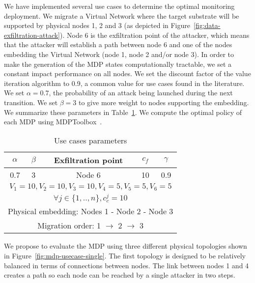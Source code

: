 We have implemented several use cases to determine the optimal monitoring deployment.
We migrate a Virtual Network where the target substrate will be supported by physical nodes 1, 2 and 3 (as depicted in Figure~\ref{fig:data-exfiltration-attack}).
Node 6 is the exfiltration point of the attacker, which means that the attacker will establish a path between node 6 and one of the nodes embedding the Virtual Network (\ie node 1, node 2 and/or node 3).
In order to make the generation of the MDP states computationally tractable, we set a constant impact performance on all nodes. We set the discount factor of the value iteration algorithm to 0.9, a common value for use cases found in the literature.
We set $\alpha=0.7$, the probability of an attack being launched during the next transition.
We set $\beta=3$ to give more weight to nodes supporting the embedding.
We summarize these parameters in Table~\ref{tab:mdp-parameters}.
We compute the optimal policy of each MDP using MDPToolbox~\cite{Chades2014}.

\begin{table}[h]
\centering
\begin{tabular}{|c|c|l|c|c|c|}
\hline
$\alpha$ & \multicolumn{2}{c|}{$\beta$} & Exfiltration point & $c_f$ & $\gamma$ \\ \hline
0.7      & \multicolumn{2}{c|}{3}       & Node 6             & 10    & 0.9      \\ \hline
\multicolumn{6}{|c|}{$V_1=10,V_2=10,V_3=10,V_4=5,V_5=5,V_6=5$}                             \\ \hline
\multicolumn{6}{|c|}{$\forall j \in \{1,..,n\}, c_c^j=10$}                             \\ \hline
\multicolumn{6}{|l|}{Physical embedding: Nodes 1 - Node 2 - Node 3}             \\ \hline
\multicolumn{6}{|c|}{Migration order: 1 $\rightarrow$ 2 $\rightarrow$ 3}                              \\ \hline
\end{tabular}
\caption{Use cases parameters}
\label{tab:mdp-parameters}
\end{table}

We propose to evaluate the MDP using three different physical topologies shown in Figure~\ref{fig:mdp-usecase-single}. The first topology is designed to be relatively balanced in terms of connections between nodes. The link between nodes 1 and 4 creates a path so each node can be reached by a single attacker in two steps.

